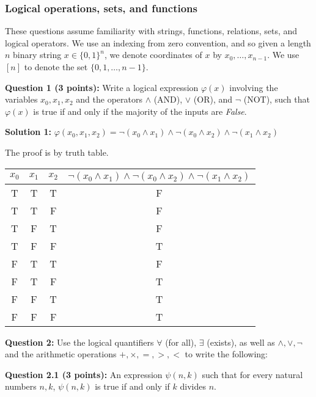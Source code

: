 \documentclass[11pt]{article}
\begin{document}
\subsubsection{Logical operations, sets, and
functions}\label{logical-operations-sets-and-functions}

These questions assume familiarity with strings, functions, relations,
sets, and logical operators. We use an indexing from zero convention,
and so given a length \(n\) binary string \(x\in \{0,1\}^n\), we denote
coordinates of \(x\) by \(x_0,\ldots,x_{n-1}\). We use \([n]\) to denote
the set \(\{0,1,\ldots,n-1\}\).

\textbf{Question 1 (3 points):} Write a logical expression
\(\varphi(x)\) involving the variables \(x_0,x_1,x_2\) and the operators
\(\wedge\) (AND), \(\vee\) (OR), and \(\neg\) (NOT), such that
\(\varphi(x)\) is true if and only if the majority of the inputs are
\emph{False}.

\textbf{Solution 1:} $\varphi(x_0,x_1,x_2) = \neg(x_0 \wedge x_1) \wedge \neg(x_0 \wedge x_2) \wedge \neg(x_1 \wedge x_2)$

The proof is by truth table.
\begin{table}[H]
  \centering
  \begin{tabular}{|c|c|c|c|}
  \hline
  \multicolumn{1}{|l|}{$x_0$} &
    \multicolumn{1}{l|}{$x_1$} &
    \multicolumn{1}{l|}{$x_2$} &
    \multicolumn{1}{l|}{$\neg(x_0 \wedge x_1) \wedge \neg(x_0 \wedge x_2) \wedge \neg(x_1 \wedge x_2)$} \\ \hline
  T & T & T & F \\ \hline
  T & T & F & F \\ \hline
  T & F & T & F \\ \hline
  T & F & F & T \\ \hline
  F & T & T & F \\ \hline
  F & T & F & T \\ \hline
  F & F & T & T \\ \hline
  F & F & F & T \\ \hline
  \end{tabular}
  \end{table}

\newpage

\textbf{Question 2:} Use the logical quantifiers \(\forall\) (for all),
\(\exists\) (exists), as well as \(\wedge,\vee,\neg\) and the arithmetic
operations \(+,\times,=,>,<\) to write the following:

\textbf{Question 2.1 (3 points):} An expression \(\psi(n,k)\) such that
for every natural numbers \(n,k\), \(\psi(n,k)\) is true if and only if
\(k\) divides \(n\).
\end{document}
